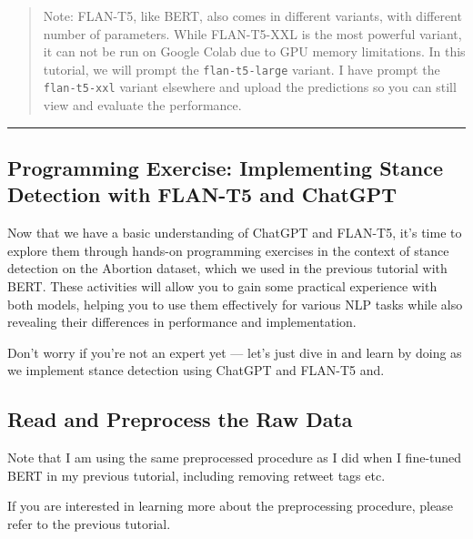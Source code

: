 \documentclass[11pt]{article}
\begin{document}
    \begin{quote}
Note: FLAN-T5, like BERT, also comes in different variants, with
different number of parameters. While FLAN-T5-XXL is the most powerful
variant, it can not be run on Google Colab due to GPU memory
limitations. In this tutorial, we will prompt the \texttt{flan-t5-large}
variant. I have prompt the \texttt{flan-t5-xxl} variant elsewhere and
upload the predictions so you can still view and evaluate the
performance.
\end{quote}

    \begin{center}\rule{0.5\linewidth}{0.5pt}\end{center}

    \hypertarget{programming-exercise-implementing-stance-detection-with-flan-t5-and-chatgpt}{%
\subsection{Programming Exercise: Implementing Stance Detection with
FLAN-T5 and
ChatGPT}\label{programming-exercise-implementing-stance-detection-with-flan-t5-and-chatgpt}}

Now that we have a basic understanding of ChatGPT and FLAN-T5, it's time
to explore them through hands-on programming exercises in the context of
stance detection on the Abortion dataset, which we used in the previous
tutorial with BERT. These activities will allow you to gain some
practical experience with both models, helping you to use them
effectively for various NLP tasks while also revealing their differences
in performance and implementation.

Don't worry if you're not an expert yet --- let's just dive in and learn
by doing as we implement stance detection using ChatGPT and FLAN-T5 and.

    \hypertarget{read-and-preprocess-the-raw-data}{%
\subsection{Read and Preprocess the Raw
Data}\label{read-and-preprocess-the-raw-data}}

Note that I am using the same preprocessed procedure as I did when I
fine-tuned BERT in my previous tutorial, including removing retweet tags
etc.

If you are interested in learning more about the preprocessing
procedure, please refer to the previous tutorial.
\end{document}

